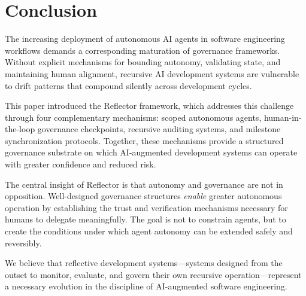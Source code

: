 \section{Conclusion}
\label{sec:conclusion}

%

The increasing deployment of autonomous AI agents in software engineering workflows
demands a corresponding maturation of governance frameworks. Without explicit
mechanisms for bounding autonomy, validating state, and maintaining human alignment,
recursive AI development systems are vulnerable to drift patterns that compound
silently across development cycles.

This paper introduced the Reflector framework, which addresses this challenge through
four complementary mechanisms: scoped autonomous agents, human-in-the-loop governance
checkpoints, recursive auditing systems, and milestone synchronization protocols.
Together, these mechanisms provide a structured governance substrate on which
AI-augmented development systems can operate with greater confidence and reduced risk.

The central insight of Reflector is that autonomy and governance are not in opposition.
Well-designed governance structures \textit{enable} greater autonomous operation by
establishing the trust and verification mechanisms necessary for humans to delegate
meaningfully. The goal is not to constrain agents, but to create the conditions under
which agent autonomy can be extended safely and reversibly.

We believe that reflective development systems—systems designed from the outset to
monitor, evaluate, and govern their own recursive operation—represent a necessary
evolution in the discipline of AI-augmented software engineering.
